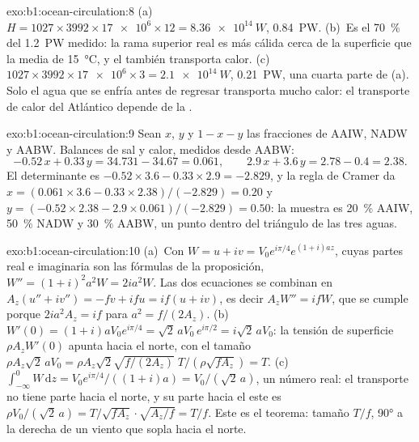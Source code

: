 \begin{solution}{exo:b1:ocean-circulation:8}
(a)~$H = 1027 \times 3992 \times \num{17e6} \times 12 = \qty{8.36e14}{W}$,
\qty{0.84}{PW}. (b)~Es el \qty{70}{\percent} del \qty{1.2}{PW} medido: la rama superior real es más cálida cerca de la superficie que la media de \qty{15}{\celsius}, y el  también transporta calor. (c)~$1027 \times 3992 \times \num{17e6} \times 3 =
\qty{2.1e14}{W}$, \qty{0.21}{PW}, una cuarta parte de (a). Solo el agua que se enfría antes de regresar transporta mucho calor: el transporte de calor del Atlántico depende de la .
\end{solution}

\begin{solution}{exo:b1:ocean-circulation:9}
Sean $x$, $y$ y $1 - x - y$ las fracciones de AAIW, NADW y AABW. Balances de sal y calor, medidos desde AABW:
\[
  -0.52\,x + 0.33\,y = 34.731 - 34.67 = 0.061,\qquad
  2.9\,x + 3.6\,y = 2.78 - 0.4 = 2.38 .
\]
El determinante es $-0.52 \times 3.6 - 0.33 \times 2.9 = -2.829$, y la regla de Cramer da $x = (0.061 \times 3.6 - 0.33 \times 2.38)/(-2.829) = 0.20$ y $y = (-0.52
\times 2.38 - 2.9 \times 0.061)/(-2.829) = 0.50$: la muestra es \qty{20}{\percent} AAIW, \qty{50}{\percent} NADW y \qty{30}{\percent} AABW, un punto dentro del triángulo de las tres aguas.
\end{solution}

\begin{solution}{exo:b1:ocean-circulation:10}
(a)~Con $W = u + iv = V_0e^{i\pi/4}e^{(1+i)az}$, cuyas partes real e imaginaria son
las fórmulas de la proposición, $W'' = (1+i)^2a^2W = 2ia^2W$. Las dos ecuaciones
se combinan en $A_z(u'' + iv'') = -fv + ifu = if(u + iv)$, es decir $A_zW'' = ifW$,
que se cumple porque $2ia^2A_z = if$ para $a^2 = f/(2A_z)$. (b)~$W'(0) =
(1+i)aV_0e^{i\pi/4} = \sqrt2\,aV_0\,e^{i\pi/2} = i\sqrt2\,aV_0$: la tensión de superficie
$\rho A_zW'(0)$ apunta hacia el norte, con el tamaño $\rho A_z\sqrt2\,aV_0 = \rho A_z\sqrt2
\sqrt{f/(2A_z)}\;T/(\rho\sqrt{fA_z}) = T$. (c)~$\int_{-\infty}^0 W\,\mathrm dz =
V_0e^{i\pi/4}/((1+i)a) = V_0/(\sqrt2\,a)$, un número real: el transporte no tiene
parte hacia el norte, y su parte hacia el este es $\rho V_0/(\sqrt2\,a) =
T/\sqrt{fA_z}\cdot\sqrt{A_z/f} = T/f$. Este es el teorema: tamaño $T/f$, \ang{90} a la
derecha de un viento que sopla hacia el norte.
\end{solution}

